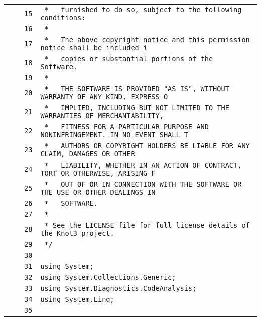 \documentclass[a4paper,10pt]{article}
\begin{document}
\begin{longtable}[l]{lrrl}
\cellcolor{gray} &  & \verb~15~ & \verb~ *   furnished to do so, subject to the following conditions:~\\
\cellcolor{gray} &  & \verb~16~ & \verb~ *~\\
\cellcolor{gray} &  & \verb~17~ & \verb~ *   The above copyright notice and this permission notice shall be included i~\\
\cellcolor{gray} &  & \verb~18~ & \verb~ *   copies or substantial portions of the Software.~\\
\cellcolor{gray} &  & \verb~19~ & \verb~ *~\\
\cellcolor{gray} &  & \verb~20~ & \verb~ *   THE SOFTWARE IS PROVIDED "AS IS", WITHOUT WARRANTY OF ANY KIND, EXPRESS O~\\
\cellcolor{gray} &  & \verb~21~ & \verb~ *   IMPLIED, INCLUDING BUT NOT LIMITED TO THE WARRANTIES OF MERCHANTABILITY,~\\
\cellcolor{gray} &  & \verb~22~ & \verb~ *   FITNESS FOR A PARTICULAR PURPOSE AND NONINFRINGEMENT. IN NO EVENT SHALL T~\\
\cellcolor{gray} &  & \verb~23~ & \verb~ *   AUTHORS OR COPYRIGHT HOLDERS BE LIABLE FOR ANY CLAIM, DAMAGES OR OTHER~\\
\cellcolor{gray} &  & \verb~24~ & \verb~ *   LIABILITY, WHETHER IN AN ACTION OF CONTRACT, TORT OR OTHERWISE, ARISING F~\\
\cellcolor{gray} &  & \verb~25~ & \verb~ *   OUT OF OR IN CONNECTION WITH THE SOFTWARE OR THE USE OR OTHER DEALINGS IN~\\
\cellcolor{gray} &  & \verb~26~ & \verb~ *   SOFTWARE.~\\
\cellcolor{gray} &  & \verb~27~ & \verb~ *~\\
\cellcolor{gray} &  & \verb~28~ & \verb~ * See the LICENSE file for full license details of the Knot3 project.~\\
\cellcolor{gray} &  & \verb~29~ & \verb~ */~\\
\cellcolor{gray} &  & \verb~30~ & \verb~~\\
\cellcolor{gray} &  & \verb~31~ & \verb~using System;~\\
\cellcolor{gray} &  & \verb~32~ & \verb~using System.Collections.Generic;~\\
\cellcolor{gray} &  & \verb~33~ & \verb~using System.Diagnostics.CodeAnalysis;~\\
\cellcolor{gray} &  & \verb~34~ & \verb~using System.Linq;~\\
\cellcolor{gray} &  & \verb~35~ & \verb~~\\

\end{longtable}
\end{document}
